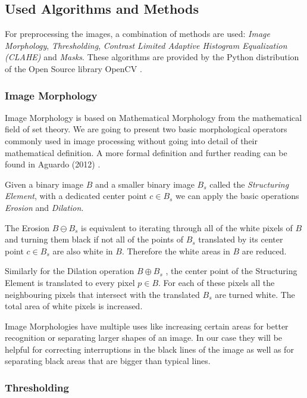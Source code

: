 \documentclass[serif,article,noparskip]{agse-thesis}
\begin{document}
\subsection{Used Algorithms and Methods} \label{used}

For preprocessing the images, a combination of methods are used: \textit{Image
Morphology}, \textit{Thresholding}, \textit{Contrast Limited Adaptive Histogram
Equalization (CLAHE)} and \textit{Masks}. These algorithms are provided by the
Python distribution of the Open Source library OpenCV \cite{opencv_library}.

\subsubsection{Image Morphology}

Image Morphology is based on Mathematical Morphology from the mathematical field
of set theory. We are going to present two basic morphological operators
commonly used in image processing without going into detail of their
mathematical definition. A more formal definition and further reading can be
found in Aguardo (2012) \cite{Aguardo2012}.

Given a binary image $B$ and a smaller binary image $B_s$ called the
\textit{Structuring Element}, with a dedicated center point $c \in B_s$ we can
apply the basic operations \textit{Erosion} and \textit{Dilation}.


The Erosion $B \ominus B_s$ is equivalent to iterating through all of the white
pixels of $B$ and turning them black if not all of the points of $B_s$
translated by its center point $c \in B_s$ are also white in $B$. Therefore the
white areas in $B$ are reduced. \cite{Smith1997}

Similarly for the Dilation operation  $B \oplus B_s$ , the center point of the
Structuring Element is translated to every pixel $p \in B$. For each of these
pixels all the neighbouring pixels that intersect with the translated $B_s$ are
turned white. The total area of white pixels is increased. \cite{Smith1997}

Image Morphologies have multiple uses like increasing certain areas for better
recognition or separating larger shapes of an image. In our case they will be
helpful for correcting interruptions in the black lines of the image as well as
for separating black areas that are bigger than typical lines.

\subsubsection{Thresholding}
\end{document}
